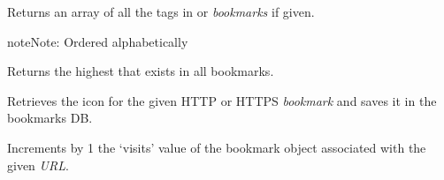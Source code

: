 \documentclass[letterpaper,10pt,openany]{sphinxmanual}
\begin{document}

\begin{fulllineitems}
\label{Applications/terminal/plugin_bookmarks:GateOne.Bookmarks.getTags}
Returns an array of all the tags in  or \emph{bookmarks} if given.

\begin{notice}{note}{Note:}
Ordered alphabetically
\end{notice}

\end{fulllineitems}


\begin{fulllineitems}
\label{Applications/terminal/plugin_bookmarks:GateOne.Bookmarks.highestUSN}
Returns the highest  that exists in all bookmarks.

\end{fulllineitems}


\begin{fulllineitems}
\label{Applications/terminal/plugin_bookmarks:GateOne.Bookmarks.httpIconHandler}
Retrieves the icon for the given HTTP or HTTPS \emph{bookmark} and saves it in the bookmarks DB.

\end{fulllineitems}


\begin{fulllineitems}
\label{Applications/terminal/plugin_bookmarks:GateOne.Bookmarks.incrementVisits}
Increments by 1 the `visits' value of the bookmark object associated with the given \emph{URL}.

\end{fulllineitems}

\end{document}
